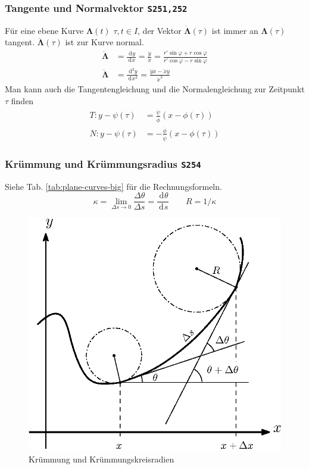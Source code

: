 \documentclass[a4paper, twocolumn]{article}
\numberwithin{equation}{subsection}
\newcommand{\dd}[2][]{\ensuremath{~\mathrm{d}^{#1} #2}}
\newcommand{\deriv}[3][]{\ensuremath{\frac{\dd[#1]{#2}}{\dd[]{#3^{#1}}}}}
\renewcommand{\vec}[1]{\ensuremath{\bm{#1}}}
\newcommand{\brpage}[1]{\textcolor{red!70!black}{\small\texttt{S#1}}}
\begin{document}
\subsubsection{Tangente und Normalvektor \brpage{251,252}}
F\"ur eine ebene Kurve \(\vec{\Lambda}(t)\) \(\tau, t \in I\), der Vektor \(\vec{\dot\Lambda}(\tau)\) ist immer an \(\vec{\Lambda}(\tau)\) tangent. \(\vec{\ddot{\Lambda}}(\tau)\) ist zur Kurve normal.
\begin{align*}
    \vec{\dot{\Lambda}}
    &= \deriv{y}{x} 
    = \frac{\dot{y}}{\dot{x}} 
    = \frac{r'\sin\varphi + r\cos\varphi}{r'\cos\varphi - r\sin\varphi}
    \\[.9em]
    \vec{\ddot{\Lambda}}
    &= \deriv[2]{y}{x}
    = \frac{\ddot{y}\dot{x} - \ddot{x}\dot{y}}{\dot{x}^3}
\end{align*}
Man kann auch die Tangentengleichung und die Normalengleichung zur Zeitpunkt \(\tau\) finden
\begin{align*}
    T: y - \psi(\tau) &= \frac{\dot{\psi}}{\dot{\phi}}(x - \phi(\tau)) \\
    N: y - \psi(\tau) &= -\frac{\dot{\phi}}{\dot{\psi}}(x - \phi(\tau))
\end{align*}

\subsubsection{Kr\"ummung und Kr\"ummungsradius \brpage{254}}
Siehe Tab. \ref{tab:plane-curves-big} f\"ur die Rechnungsformeln.
\[
    \kappa 
    = \lim_{\Delta s\to 0} \frac{\Delta \theta}{\Delta s}
    = \deriv{\theta}{s} 
    \qquad
    R = 1/\kappa
\]

\begin{figure}[h]
\centering
\includegraphics[width=.8\linewidth]{fig/plane-curvature}
\caption{Kr\"ummung und Kr\"ummungskreisradien}
\label{fig:plane-curvature}
\end{figure}
\end{document}

